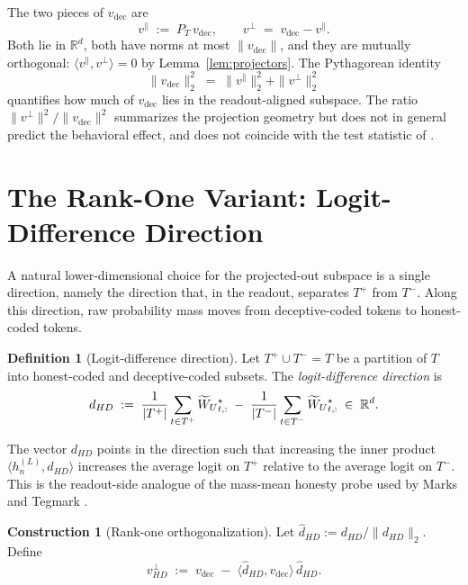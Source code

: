 \documentclass[11pt,letterpaper]{article}
\theoremstyle{plain}
\theoremstyle{definition}
\newtheorem{definition}[theorem]{Definition}
\newtheorem{construction}[theorem]{Construction}
\newcommand{\R}{\mathbb{R}}
\newcommand{\1}{\mathbf{1}}
\newcommand{\WUt}{\widetilde{W}_{U}\mathchoice{}{}{}{}}
\newcommand{\vdec}{v_{\text{dec}}}
\newcommand{\vperp}{v^{\perp}}
\newcommand{\vpar}{v^{\parallel}}
\newcommand{\PT}{P_{T}}
\newcommand{\hres}{h}
\begin{document}
The two pieces of $\vdec$ are
\begin{equation}
\vpar \;:=\; \PT \,\vdec, \qquad \vperp \;=\; \vdec - \vpar.
\label{eq:decomp}
\end{equation}
Both lie in $\R^d$, both have norms at most $\|\vdec\|$, and they are mutually orthogonal: $\langle \vpar, \vperp \rangle = 0$ by Lemma~\ref{lem:projectors}. The Pythagorean identity
\begin{equation}
\|\vdec\|_2^2 \;=\; \|\vpar\|_2^2 + \|\vperp\|_2^2
\label{eq:pythagoras}
\end{equation}
quantifies how much of $\vdec$ lies in the readout-aligned subspace. The ratio $\|\vperp\|^2 / \|\vdec\|^2$ summarizes the projection geometry but does not in general predict the behavioral effect, and does not coincide with the test statistic of .

\section{The Rank-One Variant: Logit-Difference Direction}\label{sec:logitdiff}

A natural lower-dimensional choice for the projected-out subspace is a single direction, namely the direction that, in the readout, separates $T^+$ from $T^-$. Along this direction, raw probability mass moves from deceptive-coded tokens to honest-coded tokens.

\begin{definition}[Logit-difference direction]\label{def:hd}
Let $T^+ \cup T^- = T$ be a partition of $T$ into honest-coded and deceptive-coded subsets. The \emph{logit-difference direction} is
\begin{equation}
d_{HD} \;:=\; \frac{1}{|T^+|}\sum_{t \in T^+} \WUt^\star_{t,:} \;-\; \frac{1}{|T^-|}\sum_{t \in T^-} \WUt^\star_{t,:} \;\in\; \R^d.
\label{eq:dhd}
\end{equation}
\end{definition}

The vector $d_{HD}$ points in the direction such that increasing the inner product $\langle \hres^{(L)}_n, d_{HD}\rangle$ increases the average logit on $T^+$ relative to the average logit on $T^-$. This is the readout-side analogue of the mass-mean honesty probe used by Marks and Tegmark \cite{marks2024geometry}.

\begin{construction}[Rank-one orthogonalization]\label{constr:rankone}
Let $\hat{d}_{HD} := d_{HD} / \|d_{HD}\|_2$. Define
\begin{equation}
\vperp_{HD} \;:=\; \vdec \;-\; \langle \hat{d}_{HD}, \vdec\rangle \,\hat{d}_{HD}.
\label{eq:rankone}
\end{equation}
\end{construction}
\end{document}
